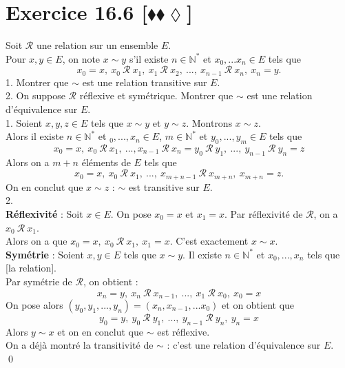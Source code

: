 \documentclass[10pt]{article}
\begin{document}
\section*{Exercice 16.6 [$\blacklozenge\blacklozenge\lozenge$]}
\begin{tcolorbox}[enhanced, width=7.6in, center, size=fbox, fontupper=\large, drop shadow southwest]
    Soit $\mathcal{R}$ une relation sur un ensemble $E$.\\
    Pour $x,y\in E$, on note $x \sim y$ s'il existe $n\in\mathbb{N}^*$ et $x_0,...x_n \in E$ tels que
    \begin{equation*}
        x_0 = x, ~ x_0 ~ \mathcal{R} ~ x_1, ~ x_1 ~ \mathcal{R} ~ x_2, ~ ..., ~ x_{n-1} ~ \mathcal{R} ~ x_n, ~ x_n = y.
    \end{equation*}
    1. Montrer que $\sim$ est une relation transitive sur $E$.\\
    2. On suppose $\mathcal{R}$ réflexive et symétrique. Montrer que $\sim$ est une relation d'équivalence sur $E$.\\[0.2cm]
    1. Soient $x,y,z\in E$ tels que $x \sim y$ et $y \sim z$. Montrons $x \sim z$.\\
    Alors il existe $n \in \mathbb{N}^*$ et $_0,...,x_n\in E$, $m \in \mathbb{N}^*$ et $y_0,...,y_m\in E$ tels que
    \begin{equation*}
        x_0 = x, ~ x_0 ~ \mathcal{R} ~ x_1, ~..., x_{n-1} ~ \mathcal{R} ~ x_n = y_0 ~ \mathcal{R} ~ y_1, ~...,~y_{n-1} ~ \mathcal{R} ~y_n=z
    \end{equation*}
    Alors on a $m+n$ éléments de $E$ tels que
    \begin{equation*}
        x_0 = x, ~ x_0 ~ \mathcal{R} ~ x_1, ~ ..., ~ x_{m+n-1} ~ \mathcal{R} ~x_{m+n}, ~ x_{m+n} = z. 
    \end{equation*}
    On en conclut que $x \sim z$ : $\sim$ est transitive sur $E$.\\[0.15cm]
    2.\\
    \textbf{Réflexivité} : Soit $x \in E$. On pose $x_0 = x$ et $x_1 = x$. Par réflexivité de $\mathcal{R}$, on a $x_0 ~ \mathcal{R} ~ x_1$.\\
    Alors on a que $x_0 = x, ~ x_0 ~ \mathcal{R} ~ x_1, ~ x_1 = x$. C'est exactement $x \sim x$.\\[0.15cm]
    \textbf{Symétrie} : Soient $x,y\in E$ tels que $x \sim y$. Il existe $n\in\mathbb{N}^*$ et $x_0,...,x_n$ tels que [la relation].\\
    Par symétrie de $\mathcal{R}$, on obtient :
    \begin{equation*}
        x_n = y, ~ x_{n} ~ \mathcal{R} ~ x_{n-1}, ~ ..., ~ x_1 ~ \mathcal{R} ~ x_0, ~ x_0 = x 
    \end{equation*}
    On pose alors $(y_0, y_1, ..., y_n) = (x_n, x_{n-1}, ... x_0)$ et on obtient que
    \begin{equation*}
        y_0 = y, ~ y_0 ~ \mathcal{R} ~ y_{1}, ~ ..., ~ y_{n-1} ~ \mathcal{R} ~ y_n, ~ y_n = x
    \end{equation*}
    Alors $y \sim x$ et on en conclut que $\sim$ est réflexive.\\
    On a déjà montré la transitivité de $\sim$ : c'est une relation d'équivalence sur $E$.\\
    \qed
\end{tcolorbox}
\end{document}
